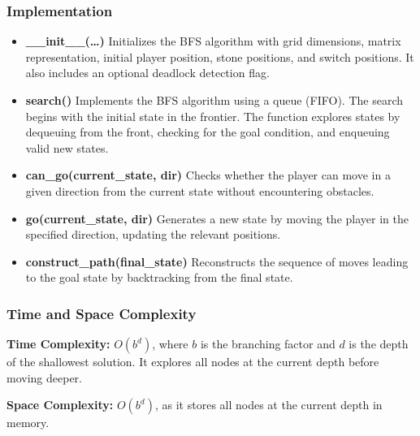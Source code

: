 \subsubsection{Implementation}
\begin{itemize}
	\item \textbf{\_\_init\_\_(\ldots)}
	      Initializes the BFS algorithm with grid dimensions, matrix representation, initial player position, stone positions, and switch positions. It also includes an optional deadlock detection flag.

	\item \textbf{search()}
	      Implements the BFS algorithm using a queue (FIFO). The search begins with the initial state in the frontier. The function explores states by dequeuing from the front, checking for the goal condition, and enqueuing valid new states.

	\item \textbf{can\_go(current\_state, dir)}
	      Checks whether the player can move in a given direction from the current state without encountering obstacles.

	\item \textbf{go(current\_state, dir)}
	      Generates a new state by moving the player in the specified direction, updating the relevant positions.

	\item \textbf{construct\_path(final\_state)}
	      Reconstructs the sequence of moves leading to the goal state by backtracking from the final state.

\end{itemize}


\subsubsection{Time and Space Complexity}
\textbf{Time Complexity:} \( O(b^d) \), where \( b \) is the branching factor and \( d \) is the depth of the shallowest solution. It explores all nodes at the current depth before moving deeper.

\textbf{Space Complexity:} \( O(b^d) \), as it stores all nodes at the current depth in memory.
